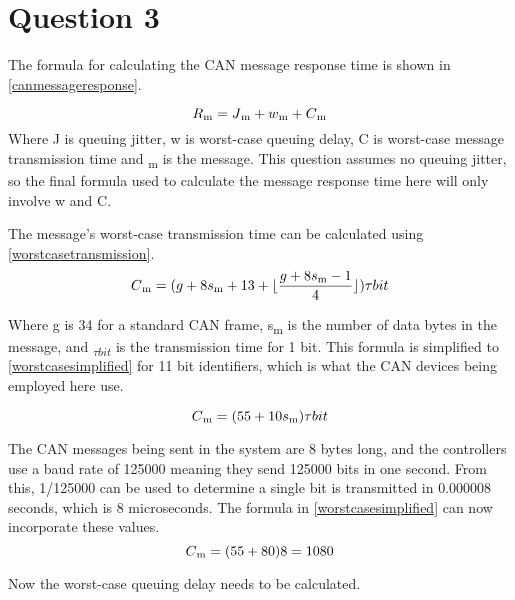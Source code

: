 \documentclass[]{report}
\begin{document}
		\section{Question 3}
		The formula for calculating the CAN message response time is shown in \ref{canmessageresponse}.
		
		\begin{equation}
		\label{canmessageresponse}
		R\textsubscript{m} = J\textsubscript{m} + w\textsubscript{m} + C\textsubscript{m}
		\end{equation}
		Where J is queuing jitter, w is worst-case queuing delay, C is worst-case message transmission time and \textsubscript{m} is the message. This question assumes no queuing jitter, so the final formula used to calculate the message response time here will only involve w and C.
		\medskip
		
		The message's worst-case transmission time can be calculated using \ref{worstcasetransmission}.
		\begin{equation}
		\label{worstcasetransmission}
		C\textsubscript{m} = (g + 8s\textsubscript{m} + 13 + \lfloor \frac{g + 8s\textsubscript{m} - 1}{4} \rfloor ) \tau bit
		\end{equation}
		
		Where g is 34 for a standard CAN frame, s\textsubscript{m} is the number of data bytes in the message, and \textsubscript{$\tau bit$} is the transmission time for 1 bit. This formula is simplified to \ref{worstcasesimplified} for 11 bit identifiers, which is what the CAN devices being employed here use.
		
		\begin{equation}
		\label{worstcasesimplified}
		C\textsubscript{m} = (55 + 10s\textsubscript{m})\tau bit
		\end{equation}
		
		The CAN messages being sent in the system are 8 bytes long, and the controllers use a baud rate of 125000 meaning they send 125000 bits in one second. From this, 1/125000 can be used to determine a single bit is transmitted in 0.000008 seconds, which is 8 microseconds. The formula in \ref{worstcasesimplified} can now incorporate these values.
		\begin{equation}
		\label{worstcasesimplifiedrealnumbers}
		C\textsubscript{m} = (55 + 80)8 = 1080
		\end{equation}
		\medskip
		
		Now the worst-case queuing delay needs to be calculated. 
		
\end{document}
